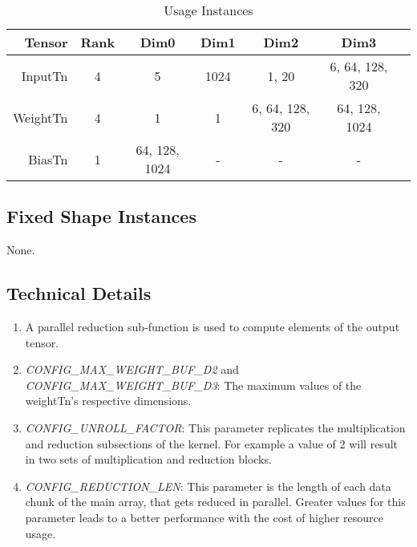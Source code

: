 \begin{table}[htbp] %
\caption{Usage Instances}
\label{tab:shapes_transpose}
	\begin{center}
		\begin{tabular}{|r|c|c|c|c|c|c|} 
		\hline	
		Tensor & Rank & Dim0 & Dim1 & Dim2 & Dim3\\ 
		\hline	
		InputTn &
			4 &
			5 &
			1024 &
			1, 20 &
			6, 64, 128, 320\\ 
		\hline
		WeightTn &
			4 &
			1 &
			1 &
			6, 64, 128, 320 &
			64, 128, 1024\\ 
		\hline
		BiasTn &
			1 &
			64, 128, 1024 &
			- &
			- &
			-\\ 
		\hline
		\end{tabular}
	\end{center}
\end{table}


\subsection{Fixed Shape Instances}
None.

\subsection{Technical Details}
\begin{enumerate}
\item A parallel reduction sub-function is used to compute elements of the output tensor.

\item \emph{CONFIG\_MAX\_WEIGHT\_BUF\_D2} and \emph{CONFIG\_MAX\_WEIGHT\_BUF\_D3}: The maximum values of the weightTn's respective dimensions.

\item \emph{CONFIG\_UNROLL\_FACTOR}: This parameter replicates the multiplication and reduction subsections of the kernel. For example a value of 2 will result in two sets of multiplication and reduction blocks.

\item \emph{CONFIG\_REDUCTION\_LEN}: This parameter is the length of each data chunk of the main array, that gets reduced in parallel. Greater values for this parameter leads to a better performance with the cost of higher resource usage.

\end{enumerate}






